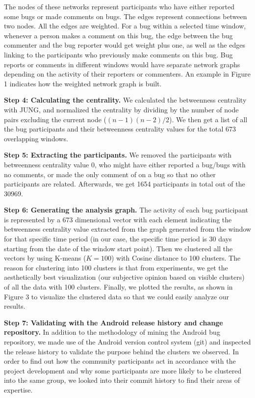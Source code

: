 \documentclass[conference]{IEEEtran}
\begin{document}
The nodes of these networks represent participants who have either
reported some bugs or made comments on bugs. The edges represent
connections between two nodes. All the edges are weighted.  
For a bug within a selected time window, whenever a person
makes a comment on this bug, the edge between the bug commenter and
the bug reporter would get weight plus one, as well as the edges
linking to the participants who previously make comments on this
bug. Bug reports or comments in different windows would have separate
network graphs depending on the activity of their reporters or
commenters. An example in Figure 1 indicates how the weighted network
graph is built.


\textbf{Step 4: Calculating the centrality.} We calculated the
betweenness centrality with JUNG, and normalized the centrality by
dividing by the number of node pairs excluding the current node
($(n-1)(n-2)/2$). We then get a list of all the bug participants and
their betweenness centrality values for the total 673 overlapping
windows.


\textbf{Step 5: Extracting the participants.} We removed the
participants with betweenness centrality value 0, who might have
either reported a bug/bugs with no comments, or made the only comment
of on a bug so that no other participants are related. Afterwards, we get
1654 participants in total out of the 30969.


\textbf{Step 6: Generating the analysis graph.} The activity
of each bug participant is represented by a 673 dimensional vector with
each element indicating the betweenness centrality value extracted
from the graph generated from the window for that
specific time period (in our case, the specific time period is 30 days
starting from the date of the window start point). Then we clustered
all the vectors by using K-means ($K=100$) with Cosine distance to 100
clusters. The reason for clustering into 100 clusters is that from
experiments, we get the aesthetically best visualization (our
subjective opinion based on visible clusters) of all the data with 100
clusters. Finally, we plotted the results, as shown in Figure 3 to
visualize the clustered data so that we could easily analyze
our results.


\textbf{Step 7: Validating with the Android release history and change
  repository.} In addition to the methodology of mining the Android
bug repository, we made use of the Android version control system
(git) and
inspected the release history to validate the purpose behind the
clusters we observed.
In order to find out how the community participants
act in accordance with the project development and why some
participants are more likely to be clustered into the same group, we
looked into their commit history to find their areas of expertise.
\end{document}

